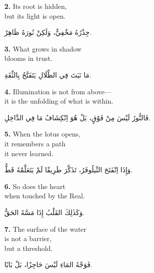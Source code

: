 \documentclass[11pt,a4paper,twoside]{book}
\begin{document}
\vspace{1em}
{\color{indigo}\bfseries 2.}\quad
Its root is hidden,\\
but its light is open.

\begin{flushright}
{\arabicfont
جِذْرُهُ مَخْفِيٌّ،
وَلَكِنْ نُورَهُ ظَاهِرٌ.}
\end{flushright}

\vspace{1em}
{\color{indigo}\bfseries 3.}\quad
What grows in shadow\\
blooms in trust.

\begin{flushright}
{\arabicfont
مَا نَبَتَ فِي الظِّلَالِ
يَتَفَتَّحُ بِالثِّقَةِ.}
\end{flushright}

\vspace{1em}
{\color{indigo}\bfseries 4.}\quad
Illumination is not from above—\\
it is the unfolding of what is within.

\begin{flushright}
{\arabicfont
فَالنُّورُ لَيْسَ مِنْ فَوْقٍ،
بَلْ هُوَ اِنْكِشَافُ مَا فِي الدَّاخِلِ.}
\end{flushright}

\vspace{1em}
{\color{indigo}\bfseries 5.}\quad
When the lotus opens,\\
it remembers a path\\
it never learned.

\begin{flushright}
{\arabicfont
وَإِذَا اِنْفَتَحَ النِّيلُوفَرُ،
تَذَكَّرَ طَرِيقًا
لَمْ يَتَعَلَّمْهُ قَطُّ.}
\end{flushright}

\vspace{1em}
{\color{indigo}\bfseries 6.}\quad
So does the heart\\
when touched by the Real.

\begin{flushright}
{\arabicfont
وَكَذٰلِكَ القَلْبُ
إِذَا مَسَّهُ الحَقُّ.}
\end{flushright}

\vspace{1em}
{\color{indigo}\bfseries 7.}\quad
The surface of the water\\
is not a barrier,\\
but a threshold.

\begin{flushright}
{\arabicfont
فَوَجْهُ المَاءِ
لَيْسَ حَاجِزًا،
بَلْ بَابًا.}
\end{flushright}
\end{document}
